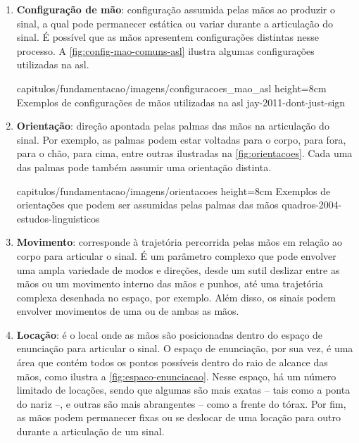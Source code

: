 \begin{enumerate}
   \item \textbf{Configuração de mão}: configuração assumida pelas mãos ao produzir o sinal, a qual pode permanecer estática ou variar durante a articulação do sinal. É possível que as mãos apresentem configurações distintas nesse processo. A \autoref{fig:config-mao-comuns-asl} ilustra algumas configurações utilizadas na \acrshort{asl}.
   
        {capitulos/fundamentacao/imagens/configuracoes_mao_asl} %
        {height=8cm} %
        {Exemplos de configurações de mãos utilizadas na \acrshort{asl}} %
        {jay-2011-dont-just-sign} %


    \item \textbf{Orientação}: direção apontada pelas palmas das mãos na articulação do sinal. Por exemplo, as palmas podem estar voltadas para o corpo, para fora, para o chão, para cima, entre outras ilustradas na \autoref{fig:orientacoes}. Cada uma das palmas pode também assumir uma orientação distinta.
    
        {capitulos/fundamentacao/imagens/orientacoes} %
        {height=8cm} %
        {Exemplos de orientações que podem ser assumidas pelas palmas das mãos} %
        {quadros-2004-estudos-linguisticos} %
    

    \item \textbf{Movimento}: corresponde à trajetória percorrida pelas mãos em relação ao corpo para articular o sinal. 
    É um parâmetro complexo que pode envolver uma ampla variedade de modos e direções, desde um sutil deslizar entre as mãos ou um movimento interno das mãos e punhos, até uma trajetória complexa desenhada no espaço, por exemplo.
    Além disso, os sinais podem envolver movimentos de uma ou de ambas as mãos.

    
    \item \textbf{Locação}: é o local onde as mãos são posicionadas dentro do espaço de enunciação para articular o sinal. O espaço de enunciação, por sua vez, é uma área que contém todos os pontos possíveis dentro do raio de alcance das mãos, como ilustra a \autoref{fig:espaco-enunciacao}. Nesse espaço, há um número limitado de locações, sendo que algumas são mais exatas -- tais como a ponta do nariz --, e outras são mais abrangentes -- como a frente do tórax. Por fim, as mãos podem permanecer fixas ou se deslocar de uma locação para outro durante a articulação de um sinal.
    

\end{enumerate}
